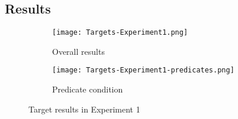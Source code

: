 \documentclass[a4paper]{article}
\begin{document}
\subsection{Results}


\begin{figure}[h!]
  \centering
  \begin{subfigure}[b]{0.45\textwidth}
    \texttt{[image: Targets-Experiment1.png]}
         \caption{Overall results}
        \label{fig:targetresults.general}
     \end{subfigure}
          \begin{subfigure}[b]{0.5\textwidth}
    \texttt{[image: Targets-Experiment1-predicates.png]}
             \caption{Predicate condition}
        \label{fig:targetresults.predicate}
      \end{subfigure}
      \caption{Target results in Experiment 1}
      \label{fig.targetresults.exp1}
\end{figure}
\end{document}
